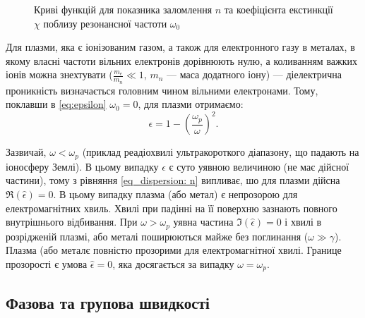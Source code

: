 \begin{figure}[h!]\centering
	
	\caption{Криві функцій для показника заломлення $n$ та коефіцієнта екстинкції $\chi$ поблизу резонансної частоти $\omega_0$}
	\label{plt:n,a(omega)}
\end{figure}

Для плазми, яка є іонізованим газом, а також для електронного газу в металах, в якому власні частоти вільних електронів дорівнюють нулю, а коливанням важких іонів можна знехтувати ($\frac{m_e}{m_n} \ll 1$, $m_n$ --- маса додатного іону) ---
діелектрична проникність визначається головним чином
вільними електронами. Тому, поклавши в \eqref{eq:epsilon} $\omega_0 = 0$, для плазми отримаємо:
\begin{equation}\label{eq:plasm}
	\epsilon = 1 - \left( \frac{\omega_p}{\omega}\right)^2.
\end{equation}

Зазвичай, $\omega < \omega_p$ (приклад реадіохвилі ультракороткого діапазону, що падають на іоносферу Землі). В цьому випадку $\epsilon$ є суто уявною величиною (не має дійсної частини), тому з рівняння \eqref{eq_dispersion: n} випливає, шо для плазми дійсна $\Re{(\hat{\epsilon})} = 0$. В цьому випадку плазма (або метал) є непрозорою для електромагнітних хвиль. Хвилі при падінні на її поверхню зазнають повного внутрішнього відбивання. При $\omega > \omega_p$ уявна частина $\Im{(\hat{\epsilon})} = 0$ і хвилі в розрідженій плазмі, або металі поширюються майже без поглинання ($\omega \gg \gamma$). Плазма (або металє повністю прозорими для електромагнітної хвилі. Границе прозорості є умова $\hat{\epsilon} = 0$, яка досягається за випадку $\omega = \omega_p$.





\subsection{Фазова та групова швидкості}



